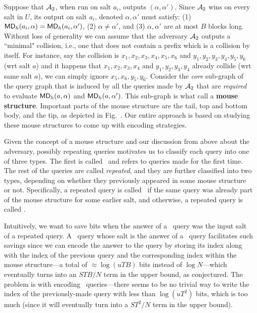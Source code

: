 Suppose that $\mathcal{A}_2$, when run on salt $a_i$, outputs $(\alpha,\alpha')$. Since $\mathcal{A}_2$ wins on every salt in $U$, its output on salt $a_i$, denoted $\alpha,\alpha'$ must satisfy: (1) $\mathsf{MD}_h(a_i,\alpha)=\mathsf{MD}_h(a_i,\alpha')$, (2) $\alpha\neq \alpha'$, and (3) $\alpha,\alpha'$ are at most $B$ blocks long. 
Without loss of generality we can assume that the adversary $\mathcal{A}_2$ outputs a ``minimal" collision, i.e., one that does not contain a prefix which is a collision by itself. For instance, say the collision is $x_1,x_2,x_3,x_4,x_5,x_6$ and $y_1,y_2,y_3,y_4,y_5,y_6$ (wrt salt $a$) and it happens that $x_1,x_2,x_3,x_4$ and $y_1,y_2,y_3,y_4$ already collide (wrt same salt $a$), we can simply ignore $x_5,x_6,y_5,y_6$.
Consider the \emph{core} sub-graph of the query graph that is induced by all the queries made by $\mathcal{A}_2$ that are \emph{required} to evaluate $\mathsf{MD}_h(a,\alpha)$ and $\mathsf{MD}_h(a,\alpha')$. This sub-graph is what call a \textbf{mouse structure}. Important parts of the mouse structure are the tail, top and bottom body, and the tip,  as depicted in Fig.~.
Our entire approach is based on studying these mouse structures to come up with encoding strategies.  

Given the concept of a mouse structure and our discussion from above about the adversary, possibly repeating queries motivates us to classify each query into one of three types. The first is called \new\ and refers to queries made for the first time. The rest of the queries are called \emph{repeated}, and they are further classified into two types, depending on whether they previously appeared in some mouse structure or not. Specifically, a repeated query is called \frep\ if the same query was already part of the mouse structure for some earlier salt, and otherwise, a repeated query is called \urep. 

Intuitively, we want to save bits when the answer of a \new\ query was the input salt of a repeated query. A \frep\ query whose salt is the answer of a \new\ query facilitates such savings since we can encode the answer to the query by storing its index along with the index of the previous query and the corresponding index within the mouse structure—a total of $\approx \log (uTB)$ bits instead of $\log N$—which eventually turns into an $STB/N$ term in the upper bound, as conjectured. The problem is with encoding \urep\ queries—there seems to be no trivial way to write the index of the previously-made query with less than $\log (uT^2)$ bits, which is too much (since it will eventually turn into a $ST^2/N$ term in the upper bound).




